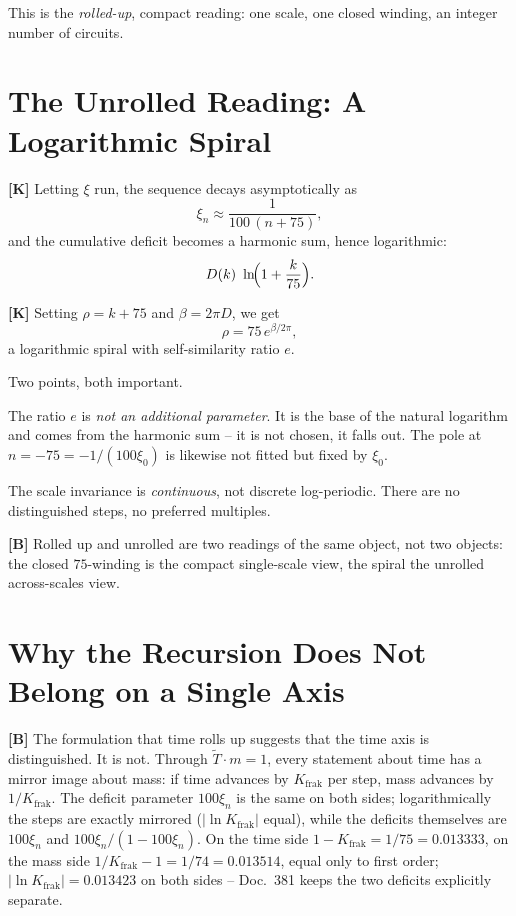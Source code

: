 This is the \emph{rolled-up}, compact reading: one scale, one closed winding,
an integer number of circuits.

\section{The Unrolled Reading: A Logarithmic Spiral}

\textbf{[K]} Letting $\xi$ run, the sequence decays asymptotically as
\[
  \xi_n \approx \frac{1}{100\,(n+75)} ,
\]
and the cumulative deficit becomes a harmonic sum, hence logarithmic:
\[
  D(k) \approx \ln\!\Bigl(1 + \frac{k}{75}\Bigr).
\]

\textbf{[K]} Setting $\rho = k + 75$ and $\beta = 2\pi D$, we get
\[
  \rho = 75\,e^{\beta/2\pi} ,
\]
a logarithmic spiral with self-similarity ratio $e$.

Two points, both important.

The ratio $e$ is \emph{not an additional parameter}. It is the base of the
natural logarithm and comes from the harmonic sum -- it is not chosen, it falls
out. The pole at $n = -75 = -1/(100\xi_0)$ is likewise not fitted but fixed
by $\xi_0$.

The scale invariance is \emph{continuous}, not discrete log-periodic. There are
no distinguished steps, no preferred multiples.

\textbf{[B]} Rolled up and unrolled are two readings of the same object, not
two objects: the closed $75$-winding is the compact single-scale view, the
spiral the unrolled across-scales view.

\section{Why the Recursion Does Not Belong on a Single Axis}

\textbf{[B]} The formulation that time rolls up suggests that the time axis is
distinguished. It is not. Through $\tilde T\cdot m = 1$, every statement about
time has a mirror image about mass: if time advances by $K_\text{frak}$ per
step, mass advances by $1/K_\text{frak}$. The deficit parameter $100\xi_n$ is the
same on both sides; logarithmically the steps are exactly mirrored ($|\ln K_\text{frak}|$
equal), while the deficits themselves are $100\xi_n$ and $100\xi_n/(1-100\xi_n)$.
On the time side $1-K_\text{frak} = 1/75 = 0.013333$, on the mass side
$1/K_\text{frak}-1 = 1/74 = 0.013514$, equal only to first order; $|\ln K_\text{frak}| = 0.013423$
on both sides -- Doc.~381 keeps the two deficits explicitly separate.

